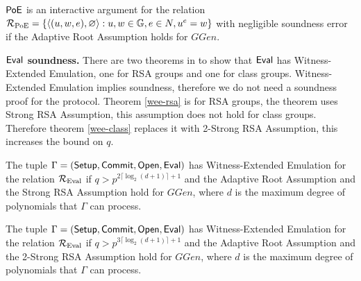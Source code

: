 
\begin{theorem}
$\mathsf{PoE}$ is an interactive argument for the relation $\mathcal{R}_{\mathrm{PoE}} = \{\langle (u, w, e), \varnothing \rangle : u, w \in \mathbb{G}, e \in N, u^e = w \}$ with negligible soundness error if the Adaptive Root Assumption holds for $GGen$.
\end{theorem}

\textbf{$\mathsf{Eval}$ soundness.} There are two theorems in \cite{bunz2020transparent} to show that $\mathsf{Eval}$ has Witness-Extended Emulation, one for RSA groups and one for class groups. Witness-Extended Emulation implies soundness, therefore we do not need a soundness proof for the protocol. Theorem \ref{wee-rsa} is for RSA groups, the theorem uses Strong RSA Assumption, this assumption does not hold for class groups. Therefore theorem \ref{wee-class} replaces it with 2-Strong RSA Assumption, this increases the bound on $q$.

\begin{theorem}
\label{wee-rsa}
The tuple $\Gamma = (\mathsf{Setup}, \mathsf{Commit}, \mathsf{Open}, \mathsf{Eval})$ has Witness-Extended Emulation for the relation $\mathcal{R}_{\mathrm{Eval}}$ if $q > p^{2\lceil \log_2(d+1) \rceil + 1}$ and the Adaptive Root Assumption and the Strong RSA Assumption hold for $GGen$, where $d$ is the maximum degree of polynomials that $\Gamma$ can process.
\end{theorem}

\begin{theorem}
\label{wee-class}
The tuple $\Gamma = (\mathsf{Setup}, \mathsf{Commit}, \mathsf{Open}, \mathsf{Eval})$ has Witness-Extended Emulation for the relation $\mathcal{R}_{\mathrm{Eval}}$ if $q > p^{3\lceil \log_2(d+1) \rceil + 1}$ and the Adaptive Root Assumption and the 2-Strong RSA Assumption hold for $GGen$, where $d$ is the maximum degree of polynomials that $\Gamma$ can process.
\end{theorem}


